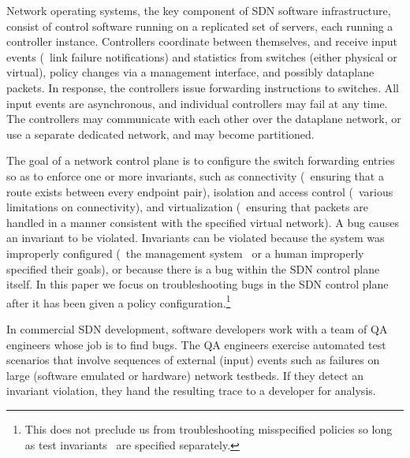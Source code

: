 %
Network operating systems, the key component of SDN software
infrastructure, consist of control software running on a replicated set of
servers, each running a controller instance. Controllers coordinate between
themselves, and receive input events (\eg~link failure notifications) and
statistics from switches (either physical or virtual), policy
changes via a management interface, and possibly dataplane packets.
In response, the
controllers issue forwarding instructions to switches. All input
events are asynchronous, and individual controllers may fail at any
time. The controllers may communicate
with each other over the dataplane network, or use a separate dedicated
network, and may become partitioned.

The goal of a network control plane is to configure the switch forwarding entries so as to
enforce one or more invariants, such as connectivity (\ie~ensuring that a
route exists between every endpoint pair), isolation and access control
(\ie~various limitations on
connectivity), and virtualization (\ie~ensuring that packets are handled
in a manner consistent with the specified virtual network).
A bug causes an invariant to be violated. Invariants can be
violated because the system was improperly configured
(\eg~the management system~\cite{quantum} or a human improperly specified their goals), or
because there is a bug within the SDN control plane itself. In this paper we focus on troubleshooting bugs in the
SDN control plane after it has been given a policy configuration.\footnote{This does
not preclude us from troubleshooting misspecified policies
so long as test
invariants~\cite{hsa} are specified separately.}

In commercial SDN development, software developers work with a team of QA engineers whose
job is to find bugs. The QA engineers exercise automated test scenarios that involve
sequences of external (input) events such as failures
on large (software emulated or hardware) network testbeds.
If they detect an invariant violation, they hand the resulting trace to a developer for analysis.

